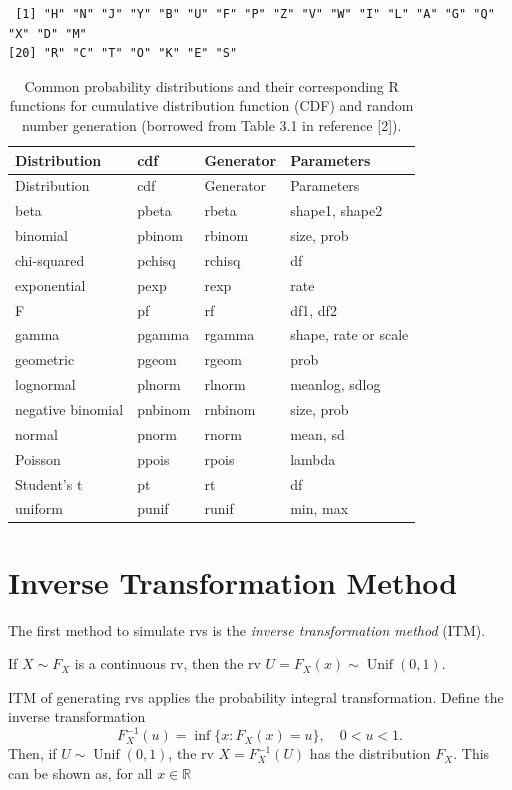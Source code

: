 \documentclass[
  letterpaper,
  DIV=11,
  numbers=noendperiod]{scrreprt}
\begin{document}
\begin{verbatim}
 [1] "H" "N" "J" "Y" "B" "U" "F" "P" "Z" "V" "W" "I" "L" "A" "G" "Q" "X" "D" "M"
[20] "R" "C" "T" "O" "K" "E" "S"
\end{verbatim}

\begin{longtable}[]{@{}llll@{}}
\caption{Common probability distributions and their corresponding R
functions for cumulative distribution function (CDF) and random number
generation (borrowed from Table 3.1 in reference
{[}2{]}).}\label{tbl-my-table}\tabularnewline
\toprule\noalign{}
Distribution & cdf & Generator & Parameters \\
\midrule\noalign{}
\endfirsthead
\toprule\noalign{}
Distribution & cdf & Generator & Parameters \\
\midrule\noalign{}
\endhead
\bottomrule\noalign{}
\endlastfoot
beta & pbeta & rbeta & shape1, shape2 \\
binomial & pbinom & rbinom & size, prob \\
chi-squared & pchisq & rchisq & df \\
exponential & pexp & rexp & rate \\
F & pf & rf & df1, df2 \\
gamma & pgamma & rgamma & shape, rate or scale \\
geometric & pgeom & rgeom & prob \\
lognormal & plnorm & rlnorm & meanlog, sdlog \\
negative binomial & pnbinom & rnbinom & size, prob \\
normal & pnorm & rnorm & mean, sd \\
Poisson & ppois & rpois & lambda \\
Student's t & pt & rt & df \\
uniform & punif & runif & min, max \\
\end{longtable}

\section{Inverse Transformation
Method}\label{inverse-transformation-method}

The first method to simulate rvs is the \emph{inverse transformation
method} (ITM).

If \(X\sim F_X\) is a continuous rv, then the rv
\(U = F_X(x) \sim \operatorname{Unif}(0,1)\).

ITM of generating rvs applies the probability integral transformation.
Define the inverse transformation
\[ F^{−1}_X(u) = \inf\{x : F_X(x) = u\},\quad  0 < u < 1.\] Then, if
\(U \sim \operatorname{Unif}(0,1)\), the rv \(X = F^{−1}_X(U)\) has the
distribution \(F_X\). This can be shown as, for all \(x \in \mathbb{R}\)
\end{document}
